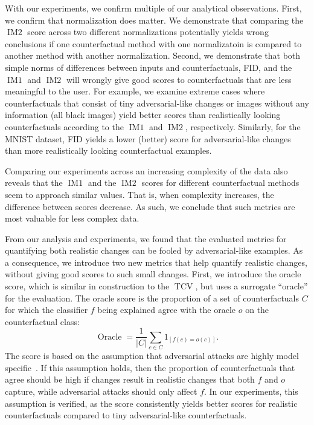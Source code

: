 \documentclass[11pt,a4paper,twoside,openright,final]{memoir}
\begin{document}
With our experiments, we confirm multiple of our analytical observations.
First, we confirm that normalization does matter.
We demonstrate that comparing the $\operatorname{IM2}$ score across two different normalizations potentially yields wrong conclusions if one counterfactual method with one normalizatoin is compared to another method with another normalization. 
Second, we demonstrate that both simple norms of differences between inputs and counterfactuals, FID, and the $\operatorname{IM1}$ and $\operatorname{IM2}$ will wrongly give good scores to counterfactuals that are less meaningful to the user.
For example, we examine extreme cases where counterfactuals that consist of tiny adversarial-like changes or images without any information (all black images) yield better scores than realistically looking counterfactuals according to the $\operatorname{IM1}$ and $\operatorname{IM2}$, respectively.
Similarly, for the MNIST dataset, FID yields a lower (better) score for adversarial-like changes than more realistically looking counterfactual examples.

Comparing our experiments across an increasing complexity of the data also reveals that the $\operatorname{IM1}$ and the $\operatorname{IM2}$ scores for different counterfactual methods seem to approach similar values.
That is, when complexity increases, the difference between scores decrease.
As such, we conclude that such metrics are most valuable for less complex data.

From our analysis and experiments, we found that the evaluated metrics for quantifying both realistic changes can be fooled by adversarial-like examples.
As a consequence, we introduce two new metrics that help quantify realistic changes, without giving good scores to such small changes.
First, we introduce the oracle score, which is similar in construction to the $\operatorname{TCV}$, but uses a surrogate ``oracle'' for the evaluation.
The oracle score is the proportion of a set of counterfactuals $C$ for which the classifier $f$ being explained agree with the oracle $o$ on the counterfactual class: 
\begin{equation}\label{eq:oracle}
    \operatorname{Oracle} = \frac{1}{|C|}\sum_{c\in C} 1_{[ f(c) = o(c) ]}.
\end{equation}
The score is based on the assumption that adversarial attacks are highly model specific~\cite{Liu2017}.
If this assumption holds, then the proportion of counterfactuals that agree should be high if changes result in realistic changes that both $f$ and $o$ capture, while adversarial attacks should only affect $f$.
In our experiments, this assumption is verified, as the score consistently yields better scores for realistic counterfactuals compared to tiny adversarial-like counterfactuals.
\end{document}
